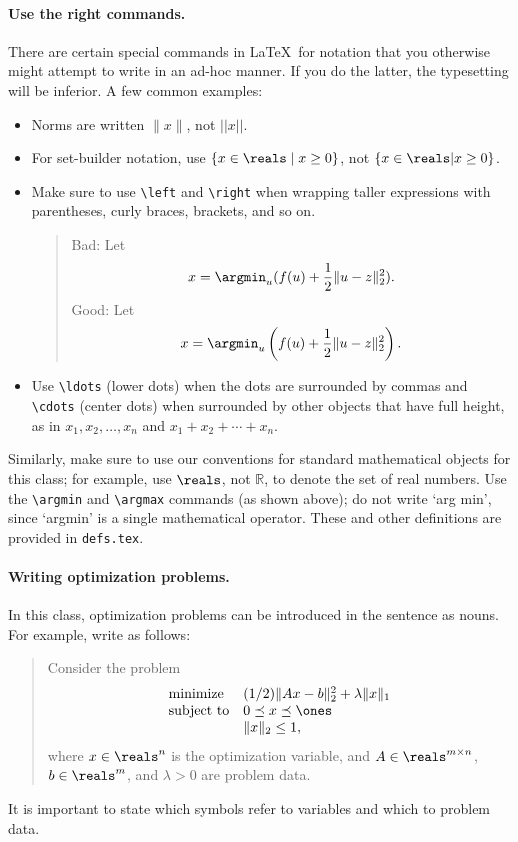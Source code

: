 \documentclass[12pt]{article}
\begin{document}
\paragraph{Use the right commands.}
There are certain special commands in \LaTeX\ for notation that you otherwise
might attempt to write in an ad-hoc manner. If you do the latter, the typesetting
will be inferior. A few common examples:
\begin{itemize}
\item Norms are written $\|x\|$, not $||x||$. 

\item For set-builder notation, use
$\{ x \in \reals \mid x \geq 0 \}$, not $\{x \in \reals | x \geq 0 \}$.

\item Make sure to use \verb+\left+ and \verb+\right+ when wrapping
taller expressions with parentheses, curly braces, brackets, and so on.
\begin{quote}
Bad: Let
\[
    x = \argmin_u (f(u) + \frac{1}{2}\|u - z\|_2^2).
\]
Good: Let
\[
    x = \argmin_u \left(f(u) + \frac{1}{2}\|u - z\|_2^2\right).
\]
\end{quote}

\item Use \verb+\ldots+ (lower dots) when the dots are surrounded by commas and
\verb+\cdots+ (center dots) when surrounded by other objects that have full
height, as in $x_1, x_2, \ldots, x_n$ and $x_1 + x_2 + \cdots + x_n$.
\end{itemize}
Similarly, make sure to use our conventions for standard mathematical objects
for this class; for example, use $\reals$, not $\mathbb{R}$, to denote the set
of real numbers. Use the \verb+\argmin+ and \verb+\argmax+ commands (as shown
above); do not write `arg min', since `argmin' is a single mathematical
operator.  These and other definitions are provided in \verb+defs.tex+.

\paragraph{Writing optimization problems.}
In this class, optimization problems can be introduced in the sentence as
nouns. For example, write as follows:
\begin{quote}
Consider the problem
    \begin{equation}
    \begin{array}{ll}
    \mbox{minimize}   & (1/2)\|Ax-b\|_2^2 + \lambda \|x\|_1 \\
    \mbox{subject to} & 0 \preceq x \preceq \ones \\
    & \|x\|_2 \leq 1,
    \end{array}
    \label{e-opt-prob}
    \end{equation}
where $x \in \reals^n$ is the optimization variable, and $A \in \reals^{m
\times n}$, $b \in \reals^m$, and $\lambda > 0$ are problem data.
\end{quote}
It is important to state which symbols refer to variables and which to problem data.
\end{document}
